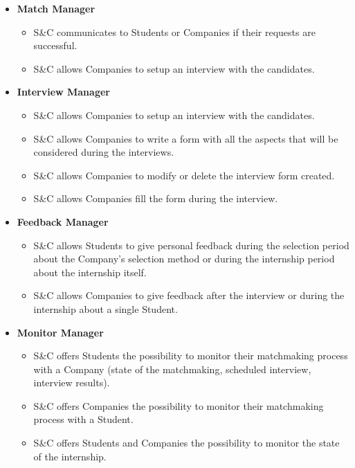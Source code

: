 \begin{itemize}
        \item \textbf{Match Manager}
        \begin{itemize}
            \item [\text{[R18]}] S\&C communicates to Students or Companies if their requests are successful.
            \item [\text{[R19]}] S\&C allows Companies to setup an interview with the candidates.
        \end{itemize}
        
    \item \textbf{Interview Manager}
        \begin{itemize}
            \item [\text{[R19]}] S\&C allows Companies to setup an interview with the candidates.
            \item [\text{[R20]}] S\&C allows Companies to write a form with all the aspects that will be considered during the interviews.
            \item [\text{[R21]}] S\&C allows Companies to modify or delete the interview form created.
            \item [\text{[R22]}] S\&C allows Companies fill the form during the interview.
        \end{itemize}

        \item \textbf{Feedback Manager}
        \begin{itemize}
            \item [\text{[R23]}] S\&C allows Students to give personal feedback during the selection period about the Company's selection method or during the internship period about the internship itself.
            \item [\text{[R24]}] S\&C allows Companies to give feedback after the interview or during the internship about a single Student.
        \end{itemize}

        \item \textbf{Monitor Manager}
        \begin{itemize}
            \item [\text{[R25]}] S\&C offers Students the possibility to monitor their matchmaking process with a Company (state of the matchmaking, scheduled interview, interview results).
            \item [\text{[R26]}] S\&C offers Companies the possibility to monitor their matchmaking process with a Student.
            \item [\text{[R27]}] S\&C offers Students and Companies the possibility to monitor the state of the internship.
        \end{itemize}
\end{itemize}
